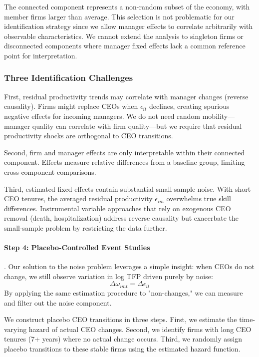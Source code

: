 \documentclass[11pt,a4paper]{article}
\begin{document}
The connected component represents a non-random subset of the economy, with member firms larger than average. This selection is not problematic for our identification strategy since we allow manager effects to correlate arbitrarily with observable characteristics. We cannot extend the analysis to singleton firms or disconnected components where manager fixed effects lack a common reference point for interpretation.


\subsubsection{Three Identification Challenges}

First, residual productivity trends may correlate with manager changes (reverse causality). Firms might replace CEOs when $\epsilon_{it}$ declines, creating spurious negative effects for incoming managers. We do not need random mobility—manager quality can correlate with firm quality—but we require that residual productivity shocks are orthogonal to CEO transitions.

Second, firm and manager effects are only interpretable within their connected component. Effects measure relative differences from a baseline group, limiting cross-component comparisons.


Third, estimated fixed effects contain substantial small-sample noise. With short CEO tenures, the averaged residual productivity $\bar{\epsilon}_{im}$ overwhelms true skill differences. Instrumental variable approaches that rely on exogenous CEO removal (death, hospitalization) address reverse causality but exacerbate the small-sample problem by restricting the data further.

\paragraph{Step 4: Placebo-Controlled Event Studies}. Our solution to the noise problem leverages a simple insight: when CEOs do not change, we still observe variation in log TFP driven purely by noise:
\begin{equation}
\Delta\omega_{imt} = \Delta\epsilon_{it}
\end{equation}
By applying the same estimation procedure to "non-changes," we can measure and filter out the noise component.

We construct placebo CEO transitions in three steps. First, we estimate the time-varying hazard of actual CEO changes. Second, we identify firms with long CEO tenures (7+ years) where no actual change occurs. Third, we randomly assign placebo transitions to these stable firms using the estimated hazard function.
\end{document}

